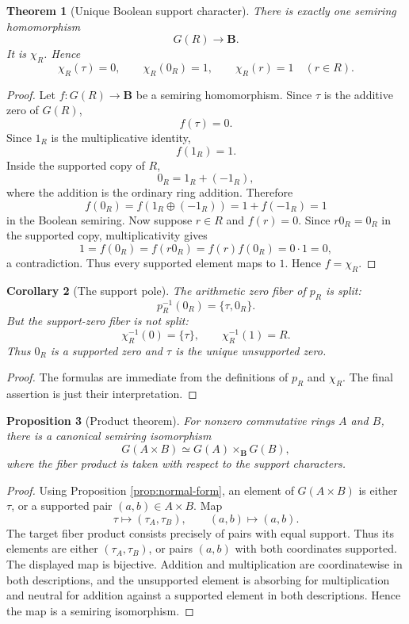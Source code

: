 \documentclass[11pt]{article}
\newcommand{\B}{\mathbf B}
\theoremstyle{plain}
\newtheorem{theorem}{Theorem}[section]
\newtheorem{proposition}[theorem]{Proposition}
\newtheorem{corollary}[theorem]{Corollary}
\theoremstyle{definition}
\begin{document}
\begin{theorem}[Unique Boolean support character]\label{thm:unique-boolean}
There is exactly one semiring homomorphism
\[
   G(R)\longrightarrow \B.
\]
It is \(\chi_R\).  Hence
\[
   \chi_R(\tau)=0,
   \qquad
   \chi_R(0_R)=1,
   \qquad
   \chi_R(r)=1\quad(r\in R).
\]
\end{theorem}

\begin{proof}
Let \(f:G(R)\to\B\) be a semiring homomorphism.  Since \(\tau\) is the additive zero of \(G(R)\),
\[
   f(\tau)=0.
\]
Since \(1_R\) is the multiplicative identity,
\[
   f(1_R)=1.
\]
Inside the supported copy of \(R\),
\[
   0_R=1_R+(-1_R),
\]
where the addition is the ordinary ring addition.  Therefore
\[
   f(0_R)=f(1_R\oplus(-1_R))=1+f(-1_R)=1
\]
in the Boolean semiring.  Now suppose \(r\in R\) and \(f(r)=0\).  Since \(r0_R=0_R\) in the supported copy, multiplicativity gives
\[
   1=f(0_R)=f(r0_R)=f(r)f(0_R)=0\cdot 1=0,
\]
a contradiction.  Thus every supported element maps to \(1\).  Hence \(f=\chi_R\).
\end{proof}

\begin{corollary}[The support pole]\label{cor:support-pole}
The arithmetic zero fiber of \(p_R\) is split:
\[
   p_R^{-1}(0_R)=\{\tau,0_R\}.
\]
But the support-zero fiber is not split:
\[
   \chi_R^{-1}(0)=\{\tau\},
   \qquad
   \chi_R^{-1}(1)=R.
\]
Thus \(0_R\) is a supported zero and \(\tau\) is the unique unsupported zero.
\end{corollary}

\begin{proof}
The formulas are immediate from the definitions of \(p_R\) and \(\chi_R\).  The final assertion is just their interpretation.
\end{proof}

\begin{proposition}[Product theorem]\label{prop:product}
For nonzero commutative rings \(A\) and \(B\), there is a canonical semiring isomorphism
\[
   G(A\times B)\simeq G(A)\times_{\B}G(B),
\]
where the fiber product is taken with respect to the support characters.
\end{proposition}

\begin{proof}
Using Proposition \ref{prop:normal-form}, an element of \(G(A\times B)\) is either \(\tau\), or a supported pair \((a,b)\in A\times B\).  Map
\[
   \tau\longmapsto (\tau_A,\tau_B),
   \qquad
   (a,b)\longmapsto (a,b).
\]
The target fiber product consists precisely of pairs with equal support.  Thus its elements are either \((\tau_A,\tau_B)\), or pairs \((a,b)\) with both coordinates supported.  The displayed map is bijective.  Addition and multiplication are coordinatewise in both descriptions, and the unsupported element is absorbing for multiplication and neutral for addition against a supported element in both descriptions.  Hence the map is a semiring isomorphism.
\end{proof}
\end{document}
